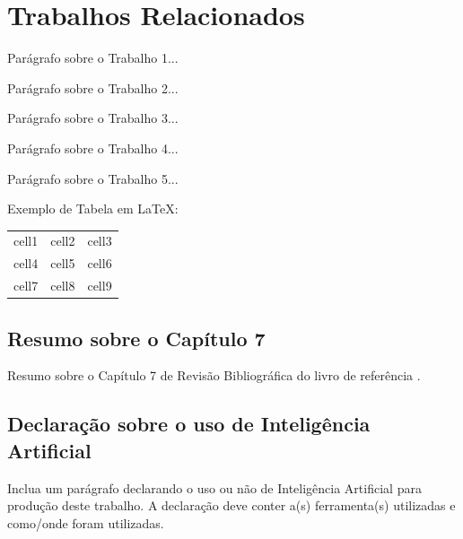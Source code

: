 \documentclass[
	12pt,				%
	openright,			%
	oneside,			%
	a4paper,			%
	chapter=TITLE,		%
	subsection=TITLE,	%
	english,			%
	brazil,				%
	]{abntex2}
\begin{document}
\chapter{Trabalhos Relacionados}

Parágrafo sobre o Trabalho 1...

Parágrafo sobre o Trabalho 2...

Parágrafo sobre o Trabalho 3...

Parágrafo sobre o Trabalho 4...

Parágrafo sobre o Trabalho 5...

Exemplo de Tabela em LaTeX:
\begin{center}
\begin{tabular}{ |c|c|c| } 
 \hline
 cell1 & cell2 & cell3 \\ 
 cell4 & cell5 & cell6 \\ 
 cell7 & cell8 & cell9 \\ 
 \hline
\end{tabular}
\end{center}


\section{Resumo sobre o Capítulo 7}

Resumo sobre o Capítulo 7 de Revisão Bibliográfica do livro de referência \cite{metodologiaWazlawick}.

\section{Declaração sobre o uso de Inteligência Artificial}

Inclua um parágrafo declarando o uso ou não de Inteligência Artificial para produção deste trabalho. A declaração deve conter a(s) ferramenta(s) utilizadas e como/onde foram utilizadas.


\end{document}
